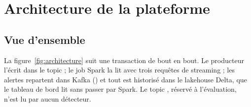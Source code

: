 \chapter{Architecture de la plateforme}
\label{ch:architecture}

\section{Vue d'ensemble}
La figure~\ref{fig:architecture} suit une transaction de bout en bout. Le
producteur l'écrit dans le topic  ; le job Spark la lit
avec trois requêtes de streaming ; les alertes repartent dans Kafka
() et tout est historisé dans le lakehouse Delta, que le
tableau de bord lit sans passer par Spark. Le topic ,
réservé à l'évaluation, n'est lu par aucun détecteur.

